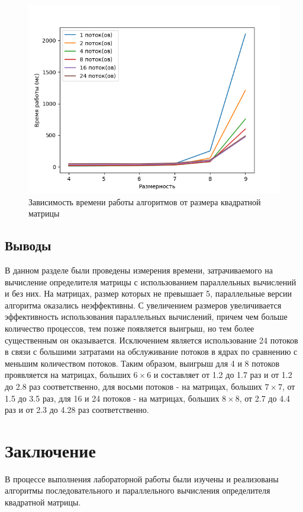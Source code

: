 \documentclass[a4paper,oneside,14pt]{extreport}
\begin{document}
\begin{figure}[H]
	\centering
	\includegraphics[width=0.9\linewidth]{images/graph}
	\caption{Зависимость времени работы алгоритмов от размера квадратной матрицы}
	\label{fig:graph}
\end{figure}

\section{Выводы}
В данном разделе были проведены измерения времени, затрачиваемого на вычисление определителя матрицы с использованием параллельных вычислений и без них.
На матрицах, размер которых не превышает 5, параллельные версии алгоритма оказались неэффективны. С увеличением размеров увеличивается эффективность использования параллельных вычислений, причем чем больше количество процессов, тем позже появляется выигрыш, но тем более существенным он оказывается. Исключением является использование 24 потоков в связи с большими затратами на обслуживание потоков в ядрах по сравнению с меньшим количеством потоков. Таким образом, выигрыш для 4 и 8 потоков проявляется на матрицах, больших $6\times6$ и составляет от 1.2 до 1.7 раз и от 1.2 до 2.8 раз соответственно, для восьми потоков - на матрицах, больших $7\times7$, от 1.5 до 3.5 раз, для 16 и 24 потоков - на матрицах, больших $8\times8$, от  2.7 до 4.4 раз и от 2.3 до 4.28 раз соответственно.
\newpage

\chapter*{Заключение}
В процессе выполнения лабораторной работы были изучены и реализованы алгоритмы последовательного и параллельного вычисления определителя квадратной матрицы.
\end{document}
